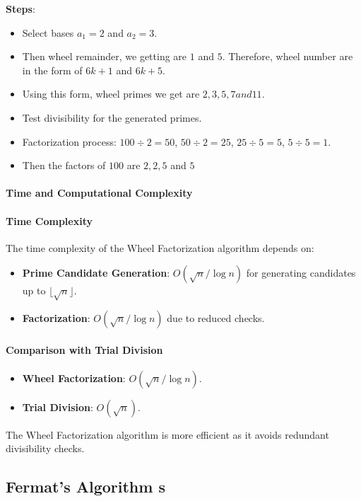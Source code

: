 \documentclass[12pt]{report}
\begin{document}
\textbf{Steps}:  
\begin{itemize}
    \item Select bases $a_1 = 2$ and $a_2 = 3$.
    \item Then wheel remainder, we getting are $1$ and $5$. Therefore, wheel number are in the form of $6k+1$ and $6k+5$.
    \item Using this form, wheel primes we get are $2,3,5,7 and 11$.
    \item Test divisibility for the generated primes.
    \item Factorization process: $100 \div 2 = 50$, $50 \div 2 = 25$, $25 \div 5 = 5$, $5 \div 5 = 1$.
    \item Then the factors of $100$ are $2,2,5$ and $5$
\end{itemize}


\paragraph{Time and Computational Complexity}

\paragraph{Time Complexity}
The time complexity of the Wheel Factorization algorithm depends on:
\begin{itemize}
    \item \textbf{Prime Candidate Generation}: $O(\sqrt{n} / \log n)$ for generating candidates up to $\lfloor \sqrt{n} \rfloor$.
    \item \textbf{Factorization}: $O(\sqrt{n} / \log n)$ due to reduced checks.
\end{itemize}

\paragraph{Comparison with Trial Division}
\begin{itemize}
  \item \textbf{Wheel Factorization}: $O(\sqrt{n} / \log n)$.
  \item \textbf{Trial Division}: $O(\sqrt{n})$.
\end{itemize}

The Wheel Factorization algorithm is more efficient as it avoids redundant divisibility checks.

\subsection{Fermat’s Algorithm s}
\end{document}
